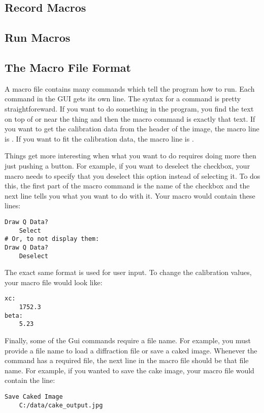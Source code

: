 \subsection{Record Macros}

\subsection{Run Macros}

\subsection{The Macro File Format}

A macro file contains many commands which tell the program
how to run. Each command in the GUI gets its own line. 
The syntax for a command is pretty straightforeward.
If you want to do
something in the program, you find the text on top of
or near the thing and then the macro command is exactly
that text. If you want to get the calibration data from the
header of the image, the macro line is
. If you want to fit the 
calibration data, the macro line is .

Things get more interesting when what you want to do
requires doing more then just pushing a button. For 
example, if you want to deselect the  
checkbox, your macro needs to specify that you deselect
this option instead of selecting it. To dos this, the 
first part of the macro command is the name of the
checkbox  and the next line tells
you what you want to do with it. Your macro would
contain these lines:
\begin{lstlisting}[caption={'Draw the $Q$ Lines on the Display'}]
Draw Q Data?
    Select
# Or, to not display them:
Draw Q Data?
    Deselect
\end{lstlisting}
The exact same format is used for user input. To change
the calibration values, your macro file would look like:
\begin{lstlisting}[caption={'Input a Number'}]
xc:
    1752.3
beta:
    5.23
\end{lstlisting}
Finally, some of the Gui commands require a file name.
For example, you must provide a file name to load a 
diffraction file or save a caked image. Whenever the
command has a required file, the next line in the macro 
file should be that file name. For example, if you wanted 
to save the cake image, your macro file would contain the 
line: 
\begin{lstlisting}[caption={'Save the Caked Image'}]
Save Caked Image
    C:/data/cake_output.jpg
\end{lstlisting}

